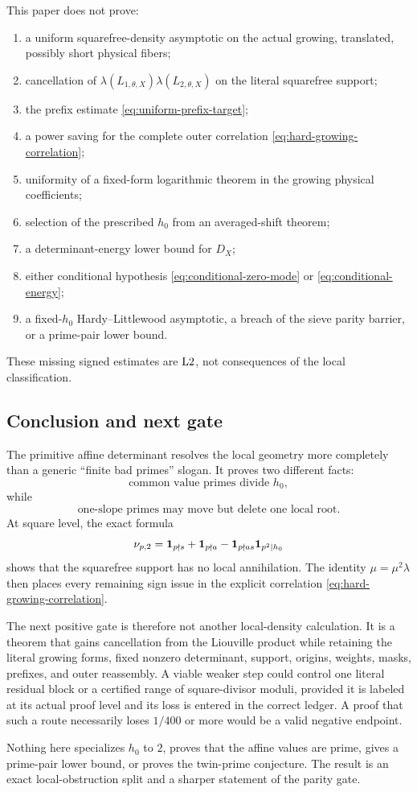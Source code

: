 This paper does not prove:
\begin{enumerate}[label=(\alph*),leftmargin=2.2em]
\item a uniform squarefree-density asymptotic on the actual growing,
translated, possibly short physical fibers;
\item cancellation of
\(\lambda(L_{1,\theta,X})\lambda(L_{2,\theta,X})\) on the literal
squarefree support;
\item the prefix estimate \eqref{eq:uniform-prefix-target};
\item a power saving for the complete outer correlation
\eqref{eq:hard-growing-correlation};
\item uniformity of a fixed-form logarithmic theorem in the growing
physical coefficients;
\item selection of the prescribed \(h_0\) from an averaged-shift
theorem;
\item a determinant-energy lower bound for \(D_X\);
\item either conditional hypothesis
\eqref{eq:conditional-zero-mode} or
\eqref{eq:conditional-energy};
\item a fixed-\(h_0\) Hardy--Littlewood asymptotic, a breach of the
sieve parity barrier, or a prime-pair lower bound.
\end{enumerate}
These missing signed estimates are \(\mathrm{L2}\), not consequences of
the local classification.

\subsection{Conclusion and next gate}

The primitive affine determinant resolves the local geometry more
completely than a generic ``finite bad primes'' slogan.  It proves
two different facts:
\[
 \text{common value primes divide }h_0,
\]
while
\[
 \text{one-slope primes may move but delete one local root.}
\]
At square level, the exact formula
\[
 \nu_{p,2}
 =
 \mathbf 1_{p\nmid s}+\mathbf 1_{p\nmid a}
 -\mathbf 1_{p\nmid as}\mathbf 1_{p^2\mid h_0}
\]
shows that the squarefree support has no local annihilation.  The
identity \(\mu=\mu^2\lambda\) then places every remaining sign issue
in the explicit correlation \eqref{eq:hard-growing-correlation}.

The next positive gate is therefore not another local-density
calculation.  It is a theorem that gains cancellation from the
Liouville product while retaining the literal growing forms, fixed
nonzero determinant, support, origins, weights, masks, prefixes, and
outer reassembly.  A viable weaker step could control one literal
residual block or a certified range of square-divisor moduli, provided
it is labeled at its actual proof level and its loss is entered in
the correct ledger.  A proof that such a route necessarily loses
\(1/400\) or more would be a valid negative endpoint.

Nothing here specializes \(h_0\) to \(2\), proves that the affine
values are prime, gives a prime-pair lower bound, or proves the
twin-prime conjecture.  The result is an exact local-obstruction
split and a sharper statement of the parity gate.
